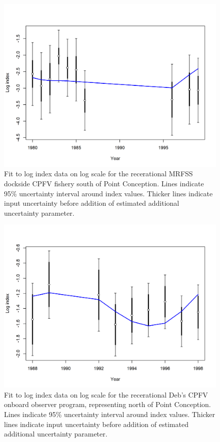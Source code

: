 \documentclass[12pt,]{article}
\begin{document}
\begin{figure}
\centering
\includegraphics{r4ss/plots_mod1/index5_logcpuefit_RecDocksideSouth.png}
\caption{Fit to log index data on log scale for the recerational MRFSS
dockside CPFV fishery south of Point Conception. Lines indicate 95\%
uncertainty interval around index values. Thicker lines indicate input
uncertainty before addition of estimated additional uncertainty
parameter. \label{fig:index5_logcpuefit_RecDocksideSouth}}
\end{figure}

\begin{figure}
\centering
\includegraphics{r4ss/plots_mod1/index5_logcpuefit_DebCPFV.png}
\caption{Fit to log index data on log scale for the recerational Deb's
CPFV onboard observer program, representing north of Point Conception.
Lines indicate 95\% uncertainty interval around index values. Thicker
lines indicate input uncertainty before addition of estimated additional
uncertainty parameter. \label{fig:index5_logcpuefit_DebCPFV}}
\end{figure}
\end{document}
